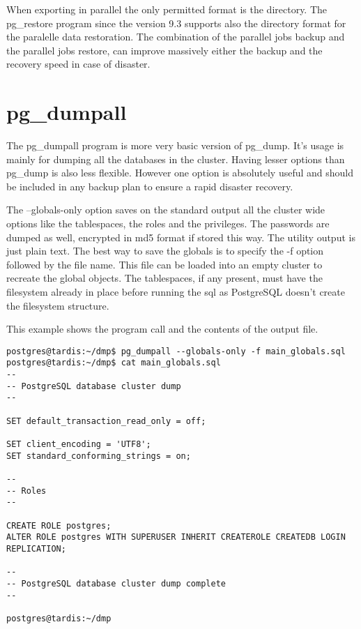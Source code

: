 When exporting in parallel the only permitted format is the directory. The pg\_restore program 
since the version 9.3 supports also the directory format for the paralelle data restoration.
The combination of the parallel jobs backup and the parallel jobs restore, can improve massively 
either the backup and the recovery speed in case of disaster.

\section{pg\_dumpall}
The pg\_dumpall program is more very basic version of pg\_dump. It's usage is mainly for 
dumping all the databases in the cluster. Having lesser options than pg\_dump is also less 
flexible. However one option is absolutely useful and should be included in any backup plan to 
ensure a rapid disaster recovery.\newline

The --globals-only option saves on the standard output all the 
cluster wide options like the tablespaces, the roles and the privileges. The passwords are dumped as 
well, encrypted in md5 format if stored this way. The utility output is just plain text. 
The best way to save the globals is to specify the -f option followed by the file name. This file 
can be loaded into an empty cluster to recreate the global objects. The tablespaces, if any present, 
must have the filesystem already in place before running the sql as PostgreSQL doesn't create the 
filesystem structure.\newline

This example shows the program call and the contents of the output file.
\begin{lstlisting}[style=pgsql]
postgres@tardis:~/dmp$ pg_dumpall --globals-only -f main_globals.sql
postgres@tardis:~/dmp$ cat main_globals.sql 
--
-- PostgreSQL database cluster dump
--

SET default_transaction_read_only = off;

SET client_encoding = 'UTF8';
SET standard_conforming_strings = on;

--
-- Roles
--

CREATE ROLE postgres;
ALTER ROLE postgres WITH SUPERUSER INHERIT CREATEROLE CREATEDB LOGIN REPLICATION;

--
-- PostgreSQL database cluster dump complete
--

postgres@tardis:~/dmp

\end{lstlisting}


